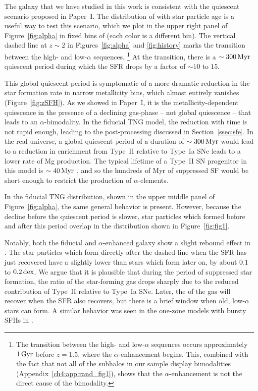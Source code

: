 The galaxy that we have studied in this work is consistent with the quiescent scenario proposed in Paper~I. The distribution of \MgFe{} with star particle age is a useful way to test this scenario, which we plot in the upper right panel of Figure~\ref{fig:alpha} in fixed bins of \FeH{} (each color is a different \FeH{} bin). The vertical dashed line at $z\sim2$ in Figures~\ref{fig:alpha} and \ref{fig:history} marks the transition between the high- and low-$\alpha$ sequences.
\footnote{The transition between the high- and low-$\alpha$ sequences occurs approximately $1\,\textrm{Gyr}$ before $z=1.5$, where the $\alpha$-enhancement begins. This, combined with the fact that not all of the subhalos in our sample display bimodalities (Appendix~\ref{ch4:app:rand_fig1}), shows that the $\alpha$-enhancement is not the direct cause of the bimodality.} At the transition, there is a $\sim300\,\textrm{Myr}$ quiescent period during which the SFR drops by a factor of $\sim10$ to $15$.

This global quiescent period is symptomatic of a more dramatic reduction in the star formation rate in narrow metallicity bins, which almost entirely vanishes (Figure~\ref{fig:zSFH}). As we showed in Paper~I, it is the metallicity-dependent quiescence in the presence of a declining gas-phase \MgFe{} -- not global quiescence -- that leads to an $\alpha$-bimodality. In the fiducial TNG model, the \MgFe{} reduction with time is not rapid enough, leading to the post-processing discussed in Section~\ref{ssec:sfe}. In the real universe, a global quiescent period of a duration of $\sim300\,\textrm{Myr}$ would lead to a reduction in enrichment from Type~II relative to Type~Ia SNe leads to a lower rate of Mg production. The typical lifetime of a Type~II SN progenitor in this model is $\sim40\,\textrm{Myr}$ \citep{2018MNRAS.473.4077P}, and so the hundreds of Myr of suppressed SF would be short enough to restrict the production of $\alpha$-elements.

In the fiducial TNG distribution, shown in the upper middle panel of Figure~\ref{fig:alpha}, the same general behavior is present. However, because the \MgFe{} decline before the quiescent period is slower, star particles which formed before and after this period overlap in the \MgFe{} distribution shown in Figure~\ref{fig:fig1}.

Notably, both the fiducial and $\alpha$-enhanced galaxy show a slight rebound effect in \MgFe{}. The star particles which form directly after the dashed line when the SFR has just recovered have a slightly lower \MgFe{} than stars which form later on, by about $0.1$ to $0.2\,\textrm{dex}$. We argue that it is plausible that during the period of suppressed star formation, the \alphaFe{} ratio of the star-forming gas drops sharply due to the reduced contribution of Type~II relative to Type~Ia SNe. Later, the \alphaFe{} of the gas will recover when the SFR also recovers, but there is a brief window when old, low-$\alpha$ stars can form. A similar behavior was seen in the one-zone models with bursty SFHs in \citet{2020MNRAS.498.1364J}.

